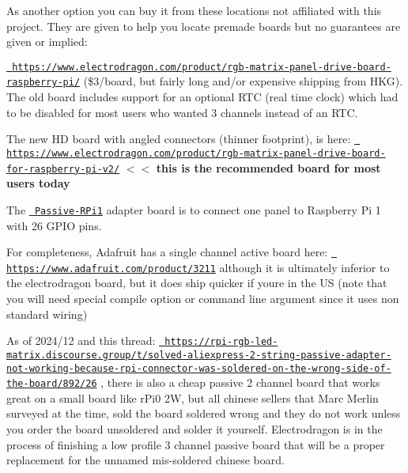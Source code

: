 \begin{DoxyItemize}
As another option you can buy it from these locations not affiliated with this project. They are given to help you locate premade boards but no guarantees are given or implied\+:
\begin{DoxyItemize}
\item \href{https://www.electrodragon.com/product/rgb-matrix-panel-drive-board-raspberry-pi/}{\texttt{ https\+://www.\+electrodragon.\+com/product/rgb-\/matrix-\/panel-\/drive-\/board-\/raspberry-\/pi/}} (\$3/board, but fairly long and/or expensive shipping from HKG). The old board includes support for an optional RTC (real time clock) which had to be disabled for most users who wanted 3 channels instead of an RTC.
\item The new HD board with angled connectors (thinner footprint), is here\+: \href{https://www.electrodragon.com/product/rgb-matrix-panel-drive-board-for-raspberry-pi-v2/}{\texttt{ https\+://www.\+electrodragon.\+com/product/rgb-\/matrix-\/panel-\/drive-\/board-\/for-\/raspberry-\/pi-\/v2/}} \texorpdfstring{$<$}{<}\texorpdfstring{$<$}{<} {\bfseries{this is the recommended board for most users today}} 
\end{DoxyItemize}
\item The \href{./passive-rpi1}{\texttt{ Passive-\/\+RPi1}} adapter board is to connect one panel to Raspberry Pi 1 with 26 GPIO pins.
\item For completeness, Adafruit has a single channel active board here\+: \href{https://www.adafruit.com/product/3211}{\texttt{ https\+://www.\+adafruit.\+com/product/3211}} although it is ultimately inferior to the electrodragon board, but it does ship quicker if you\textquotesingle{}re in the US (note that you will need special compile option or command line argument since it uses non standard wiring)
\item As of 2024/12 and this thread\+: \href{https://rpi-rgb-led-matrix.discourse.group/t/solved-aliexpress-2-string-passive-adapter-not-working-because-rpi-connector-was-soldered-on-the-wrong-side-of-the-board/892/26}{\texttt{ https\+://rpi-\/rgb-\/led-\/matrix.\+discourse.\+group/t/solved-\/aliexpress-\/2-\/string-\/passive-\/adapter-\/not-\/working-\/because-\/rpi-\/connector-\/was-\/soldered-\/on-\/the-\/wrong-\/side-\/of-\/the-\/board/892/26}} , there is also a cheap passive 2 channel board that works great on a small board like r\+Pi0 2W, but all chinese sellers that Marc Merlin surveyed at the time, sold the board soldered wrong and they do not work unless you order the board unsoldered and solder it yourself. Electrodragon is in the process of finishing a low profile 3 channel passive board that will be a proper replacement for the unnamed mis-\/soldered chinese board.
\end{DoxyItemize}

 